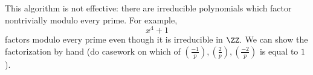 \begin{remark}[Nir]
	This algorithm is not effective: there are irreducible polynomials which factor nontrivially modulo every prime. For example,
	\[x^4+1\]
	factors modulo every prime even though it is irreducible in $\ZZ.$ We can show the factorization by hand (do casework on which of $\left(\frac{-1}p\right),\left(\frac2p\right),\left(\frac{-2}p\right)$ is equal to $1$).
\end{remark}

